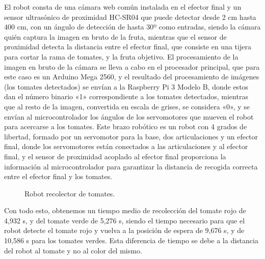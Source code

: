 El robot consta de una cámara web común instalada en el efector final y un sensor ultrasónico de proximidad HC-SR04 que puede detectar desde 2 cm hasta 400 cm, con un ángulo de detección de hasta 30º como entradas, siendo la cámara quién captura la imagen en bruto de la fruta, mientras que el sensor de proximidad detecta la distancia entre el efector final, que consiste en una tijera para cortar la rama de tomates, y la fruta objetivo. El procesamiento de la imagen en bruto de la cámara se lleva a cabo en el procesador principal, que para este caso es un Arduino Mega 2560, y el resultado del procesamiento de imágenes (los tomates detectados) se envían a la Raspberry Pi 3 Modelo B, donde estos dan el número binario «1» correspondiente a los tomates detectados, mientras que al resto de la imagen, convertida en escala de grises, se considera «0», y se envían al microcontrolador los ángulos de los servomotores que mueven el robot para acercarse a los tomates. Este brazo robótico es un robot con 4 grados de libertad, formado por un servomotor para la base, dos articulaciones y un efector final, donde los servomotores están conectados a las articulaciones y al efector final, y el sensor de proximidad acoplado al efector final proporciona la información al microcontrolador para garantizar la distancia de recogida correcta entre el efector final y los tomates.

\newpage
\begin{figure}[h!]
    \begin{center}
      \subcapcentertrue
      \hspace{2mm}
    \end{center}
    \caption{Robot recolector de tomates.}
    \label{fig:Robots_tomates}
  \end{figure}

Con todo esto, obtenemos un tiempo medio de recolección del tomate rojo de 4,932 s, y del tomate verde de 5,276 s, siendo el tiempo necesario para que el robot detecte el tomate rojo y vuelva a la posición de espera de 9,676 s, y de 10,586 s para los tomates verdes. Esta diferencia de tiempo se debe a la distancia del robot al tomate y no al color del mismo.








